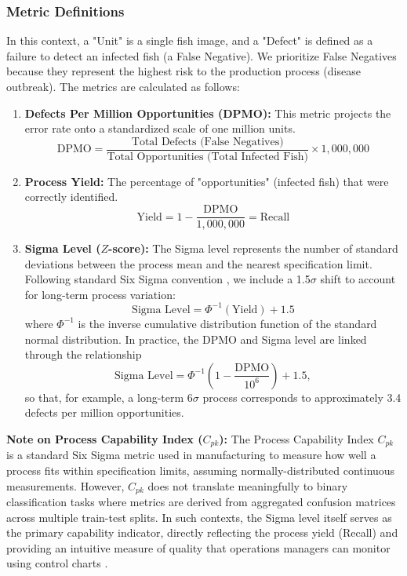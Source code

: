 \documentclass[12pt,a4paper]{article}
\newcommand{\DPMO}{\mathrm{DPMO}}
\begin{document}
\subsubsection{Metric Definitions}
In this context, a "Unit" is a single fish image, and a "Defect" is defined as a failure to detect an infected fish (a False Negative). We prioritize False Negatives because they represent the highest risk to the production process (disease outbreak). The metrics are calculated as follows:

\begin{enumerate}
    \item \textbf{Defects Per Million Opportunities (DPMO):}
    This metric projects the error rate onto a standardized scale of one million units.
    \begin{equation}
    \DPMO = \frac{\text{Total Defects (False Negatives)}}{\text{Total Opportunities (Total Infected Fish)}} \times 1,000,000
    \end{equation}
    
    \item \textbf{Process Yield:}
    The percentage of "opportunities" (infected fish) that were correctly identified.
    \begin{equation}
    \text{Yield} = 1 - \frac{\text{DPMO}}{1,000,000} = \text{Recall}
    \end{equation}
    
    \item \textbf{Sigma Level ($Z$-score):}
    The Sigma level represents the number of standard deviations between the process mean and the nearest specification limit. Following standard Six Sigma convention \citep{Tsung2023}, we include a 1.5$\sigma$ shift to account for long-term process variation:
    \begin{equation}
    \text{Sigma Level} = \Phi^{-1}(\text{Yield}) + 1.5
    \end{equation}
    where $\Phi^{-1}$ is the inverse cumulative distribution function of the standard normal distribution.
    In practice, the DPMO and Sigma level are linked through the relationship
    \begin{equation}
        \text{Sigma Level} = \Phi^{-1}\left(1 - \frac{\DPMO}{10^6} \right) + 1.5,
    \end{equation}
    so that, for example, a long-term 6$\sigma$ process corresponds to approximately 3.4 defects per million opportunities.
\end{enumerate}

\textbf{Note on Process Capability Index ($C_{pk}$):} The Process Capability Index $C_{pk}$ is a standard Six Sigma metric used in manufacturing to measure how well a process fits within specification limits, assuming normally-distributed continuous measurements. However, $C_{pk}$ does not translate meaningfully to binary classification tasks where metrics are derived from aggregated confusion matrices across multiple train-test splits. In such contexts, the Sigma level itself serves as the primary capability indicator, directly reflecting the process yield (Recall) and providing an intuitive measure of quality that operations managers can monitor using control charts \citep{montgomery2020introduction}.
\end{document}
